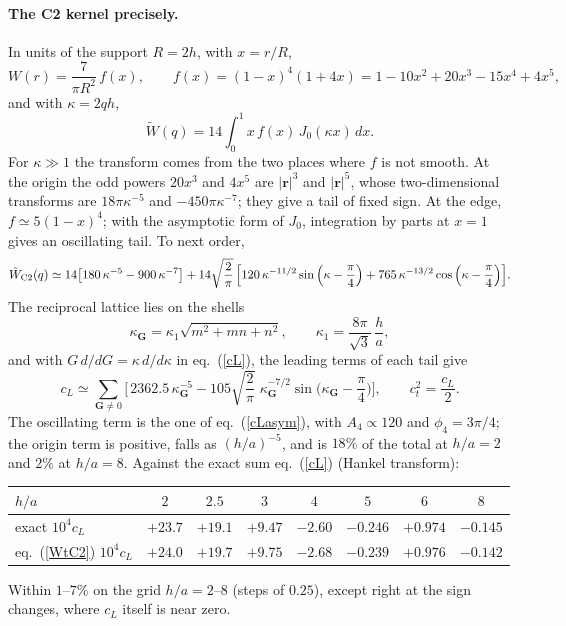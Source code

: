 \documentclass[11pt,aps,preprint,nofootinbib,superscriptaddress,tightenlines]{revtex4-2}
\def\st{\begin{equation}}
\def\stp{\end{equation}}
\def\Eq#1{eq.~(\ref{#1})}
\let\oldparagraph\paragraph
\renewcommand{\paragraph}{\par\bigskip\oldparagraph}
\begin{document}
\paragraph{The C2 kernel precisely.}  In units of the support $R=2h$, with $x=r/R$,
\st
W(r)=\frac{7}{\pi R^2}\,f(x),\qquad
f(x)=(1-x)^4(1+4x)=1-10x^2+20x^3-15x^4+4x^5 ,
\stp
and with $\kappa=2qh$,
\st
\tilde W(q)=14\int_0^1x\,f(x)\,J_0(\kappa x)\,dx .
\stp
For $\kappa\gg1$ the transform comes from the two places where $f$ is not smooth.  At the
origin the odd powers $20x^3$ and $4x^5$ are $|\bm r|^3$ and $|\bm r|^5$, whose two-dimensional
transforms are $18\pi\kappa^{-5}$ and $-450\pi\kappa^{-7}$; they give a tail of fixed sign.  At the
edge, $f\simeq5(1-x)^4$; with the asymptotic form of $J_0$, integration by parts at $x=1$ gives
an oscillating tail.  To next order,
\st
\tilde W_{\rm C2}(q)\simeq14\big[180\,\kappa^{-5}-900\,\kappa^{-7}\big]
+14\sqrt{\frac2\pi}\,\Big[120\,\kappa^{-11/2}\sin\Big(\kappa-\frac\pi4\Big)
+765\,\kappa^{-13/2}\cos\Big(\kappa-\frac\pi4\Big)\Big].
\label{WtC2}
\stp
The reciprocal lattice lies on the shells
\st
\kappa_{\bm G}=\kappa_1\sqrt{m^2+mn+n^2},\qquad \kappa_1=\frac{8\pi}{\sqrt3}\,\frac ha ,
\stp
and with $G\,d/dG=\kappa\,d/d\kappa$ in \Eq{cL}, the leading terms of each tail give
\st
c_L\simeq\sum_{\bm G\neq0}\Big[\,2362.5\,\kappa_{\bm G}^{-5}
-105\sqrt{\frac2\pi}\;\kappa_{\bm G}^{-7/2}\sin\Big(\kappa_{\bm G}-\frac\pi4\Big)\Big],
\qquad c_t^2=\frac{c_L}{2}.
\label{cLC2}
\stp
The oscillating term is the one of \Eq{cLasym}, with $A_4\propto120$ and $\phi_4=3\pi/4$; the
origin term is positive, falls as $(h/a)^{-5}$, and is $18\%$ of the total at $h/a=2$ and $2\%$
at $h/a=8$.  Against the exact sum \Eq{cL} (Hankel transform):
\begin{center}
\begin{tabular}{lccccccc}
\hline
$h/a$ & $2$ & $2.5$ & $3$ & $4$ & $5$ & $6$ & $8$ \\ \hline
exact $10^4c_L$ & $+23.7$ & $+19.1$ & $+9.47$ & $-2.60$ & $-0.246$ & $+0.974$ & $-0.145$ \\
\Eq{WtC2} $10^4c_L$ & $+24.0$ & $+19.7$ & $+9.75$ & $-2.68$ & $-0.239$ & $+0.976$ & $-0.142$ \\
\hline
\end{tabular}
\end{center}
Within $1$--$7\%$ on the grid $h/a=2$--$8$ (steps of $0.25$), except right at the sign changes,
where $c_L$ itself is near zero.
\end{document}

